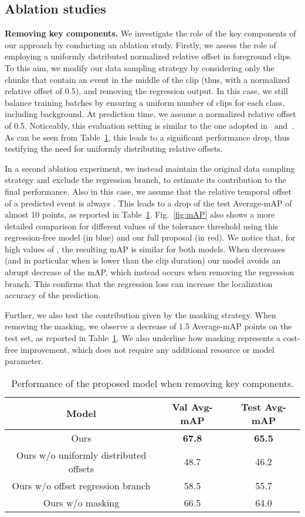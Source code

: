 \documentclass[a4paper,conference]{IEEEtran}
\newcommand{\tit}[1]{\smallbreak\noindent\textbf{#1.}}
\begin{document}
\subsection{Ablation studies}
\label{sec:ablations}
\tit{Removing key components}
We investigate the role of the key components of our approach by conducting an ablation study. 
Firstly, we assess the role of employing a uniformly distributed normalized relative offset in foreground clips. To this aim, we modify our data sampling strategy by considering only the chunks that contain an event in the middle of the clip (thus, with a normalized relative offset of 0.5), and removing the regression output. In this case, we still balance training batches by ensuring a uniform number of clips for each class, including background. At prediction time, we assume a normalized relative offset of 0.5. Noticeably, this evaluation setting is similar to the one adopted in~\cite{giancola2018soccernet} and~\cite{vats2020event}. As can be seen from Table~\ref{tab:abl}, this leads to a significant performance drop, thus testifying the need for uniformly distributing relative offsets. 

In a second ablation experiment, we instead maintain the original data sampling strategy and exclude the regression branch, to estimate its contribution to the final performance. Also in this case, we assume that the relative temporal offset of a predicted event is always . This leads to a drop of the test Average-mAP of almost 10 points, as reported in Table~\ref{tab:abl}. Fig.~\ref{fig:mAP} also shows a more detailed comparison for different values of the tolerance threshold  using this regression-free model (in blue) and our full proposal (in red). We notice that, for high values of , the resulting mAP is similar for both models. When  decreases (and in particular when  is lower than the clip duration) our model avoids an abrupt decrease of the mAP, which instead occurs when removing the regression branch. This confirms that the regression loss can increase the localization accuracy of the prediction.

Further, we also test the contribution given by the masking strategy. When removing the masking, we observe a decrease of 1.5 Average-mAP points on the test set, as reported in Table~\ref{tab:abl}. We also underline how masking represents a cost-free improvement, which does not require any additional resource or model parameter.

\begin{table}[t]
\centering
\caption{Performance of the proposed model when removing key components.}
\begin{tabular}{ccc}
    \toprule 
    Model & Val Avg-mAP & Test Avg-mAP \\
    \midrule
    Ours & \textbf{67.8} & \textbf{65.5} \\
    Ours w/o uniformly distributed offsets & 48.7 & 46.2 \\
    Ours w/o offset regression branch & 58.5 & 55.7 \\
    Ours w/o masking & 66.5 & 64.0 \\
    \bottomrule
\end{tabular}
\label{tab:abl}
\end{table}
\end{document}
